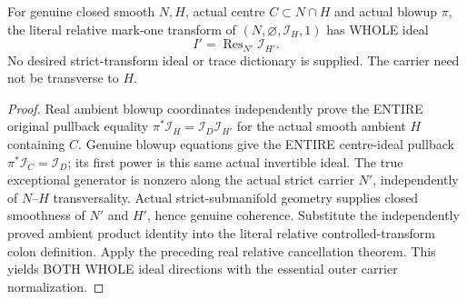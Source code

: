 \begin{theorem}
\label{hir:sharp-actual-first-controlled-ambient-strict-trace-whole}
\leanok
For genuine closed smooth $N,H$, actual centre $C\subset N\cap H$ and
actual blowup $\pi$, the literal relative mark-one transform of
$(N,\varnothing,\mathcal I_H,1)$ has WHOLE ideal
\[
 I'=\operatorname{Res}_{N'}\mathcal I_{H'}.
\]
No desired strict-transform ideal or trace dictionary is supplied. The
carrier need not be transverse to $H$.
\end{theorem}
\begin{proof}
Real ambient blowup coordinates independently prove the ENTIRE original
pullback equality $\pi^*\mathcal I_H=\mathcal I_D\mathcal I_{H'}$ for the
actual smooth ambient $H$ containing $C$. Genuine blowup equations give
the ENTIRE centre-ideal pullback $\pi^*\mathcal I_C=\mathcal I_D$; its
first power is this same actual invertible ideal. The true exceptional
generator is nonzero along the actual strict carrier $N'$, independently
of $N$--$H$ transversality. Actual strict-submanifold geometry supplies
closed smoothness of $N'$ and $H'$, hence genuine coherence. Substitute
the independently proved ambient product identity into the literal
relative controlled-transform colon definition. Apply the preceding
real relative cancellation theorem. This yields BOTH WHOLE ideal
directions with the essential outer carrier normalization.
\end{proof}

